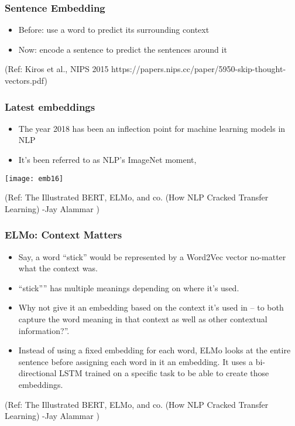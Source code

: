 \begin{frame}[fragile]\frametitle{Sentence Embedding}

\begin{itemize}
\item  Before: use a word to predict its 
surrounding context
\item Now: encode a sentence to predict 
the sentences around it 
\end{itemize}

{\tiny (Ref: Kiros et al., NIPS 2015 https://papers.nips.cc/paper/5950-skip-thought-vectors.pdf)}
\end{frame}

\begin{frame}[fragile]\frametitle{Latest embeddings}

\begin{itemize}
\item  The year 2018 has been an inflection point for machine learning models in NLP 
\item It’s been referred to as NLP’s ImageNet moment,
\end{itemize}

\begin{center}
\texttt{[image: emb16]}
\end{center}

{\tiny (Ref: The Illustrated BERT, ELMo, and co. (How NLP Cracked Transfer Learning) -Jay Alammar )}
\end{frame}

\begin{frame}[fragile]\frametitle{ELMo: Context Matters}
\begin{itemize}
\item  Say, a word “stick” would be represented by a Word2Vec vector no-matter what the context was. 
\item  “stick”” has multiple meanings depending on where it’s used. 
\item Why not give it an embedding based on the context it’s used in – to both capture the word meaning in that context as well as other contextual information?”. 
\item Instead of using a fixed embedding for each word, ELMo looks at the entire sentence before assigning each word in it an embedding. It uses a bi-directional LSTM trained on a specific task to be able to create those embeddings.

\end{itemize}


{\tiny (Ref: The Illustrated BERT, ELMo, and co. (How NLP Cracked Transfer Learning) -Jay Alammar )}
\end{frame}

